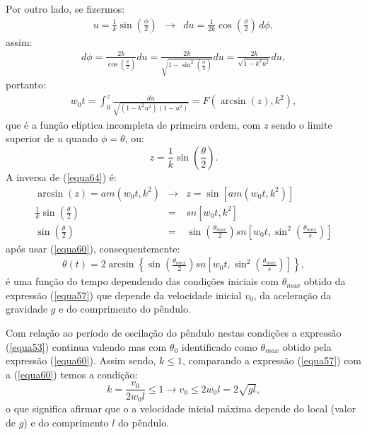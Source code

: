 \documentclass[12pt,openright,twoside,english,brazil]{abntex2}
\begin{document}
Por outro lado, se fizermos:
\begin{eqnarray}
 u = \frac{1}{k} \sin{\left( \frac{\phi}{2} \right)} & \rightarrow & du = \frac{1}{2k} \cos{\left( \frac{\phi}{2} \right)}\, d\phi,
\end{eqnarray}
assim:
\begin{eqnarray}
 d\phi = \frac{2k}{\cos{\left( \frac{\phi}{2} \right)}} du = \frac{2k}{\sqrt{1-\sin^2{\left( \frac{\phi}{2} \right)}}} du = \frac{2k}{\sqrt{1-k^2 u^2}} du,
\end{eqnarray}
portanto:
\begin{eqnarray}
 w_0t = \int_0^z \frac{du}{\sqrt{(1-k^2 u^2)(1-u^2)}} = F(\arcsin{(z)},k^2),
 \label{equa64}
\end{eqnarray}
que é a função elíptica incompleta de primeira ordem, com $z$ sendo o limite superior de $u$ quando $\phi=\theta$, ou:
\begin{equation}
 z = \frac{1}{k} \sin{\left( \frac{\theta}{2} \right)}.
\end{equation}
A inversa de (\ref{equa64}) é:
\begin{eqnarray}
 \arcsin{(z)} = am(w_0t,k^2) & \rightarrow & z = \sin{\left[ am(w_0t,k^2) \right]} \nonumber \\
 \frac{1}{k} \sin{\left( \frac{\theta}{2} \right)} & = & sn \left[ w_0t, k^2\right] \nonumber \\
 \sin{\left( \frac{\theta}{2} \right)} & = & \sin{\left( \frac{\theta_{max}}{2} \right)} sn \left[ w_0t, \sin^2{\left( \frac{\theta_{max}}{s} \right)} \right] \nonumber
\end{eqnarray}
após usar (\ref{equa60}), consequentemente:
\begin{eqnarray}
 \boxed{\theta(t) = 2 \arcsin{\left\{ \sin{\left( \frac{\theta_{max}}{2} \right)} sn \left[ w_0t, \sin^2{\left( \frac{\theta_{max}}{s} \right)} \right] \right\}}},
 \label{equa66}
\end{eqnarray}
é uma função do tempo dependendo das condições iniciais com $\theta_{max}$ obtido da expressão (\ref{equa57}) que depende da velocidade inicial $v_0$, da aceleração da gravidade $g$ e do comprimento do pêndulo.

Com relação ao período de oscilação do pêndulo nestas condições a expressão (\ref{equa53}) continua valendo mas com $\theta_0$ identificado como $\theta_{max}$ obtido pela expressão (\ref{equa60}). Assim sendo, $k\leq 1$, comparando a expressão (\ref{equa57}) com a (\ref{equa60}) temos a condição:
\begin{equation}
 \boxed{k = \frac{v_0}{2w_0l} \leq 1 \rightarrow v_0 \leq 2w_0l = 2\sqrt{gl}},
 \label{equa67}
\end{equation}
o que significa afirmar que o a velocidade inicial máxima depende do local (valor de $g$) e do comprimento $l$ do pêndulo.
\end{document}
